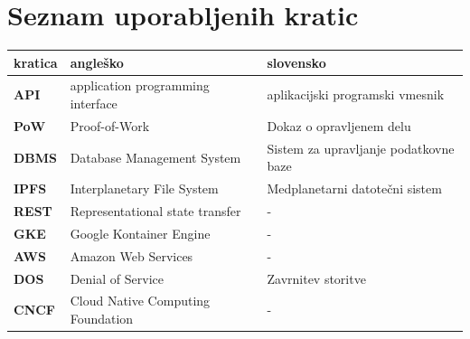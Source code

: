 \documentclass[a4paper, 12pt]{book}
\newcommand{\clearemptydoublepage}{\newpage{\pagestyle{empty}\cleardoublepage}}
\begin{document}
\clearemptydoublepage


\pagestyle{empty}
\def\thepage{}%
\tableofcontents{}


\clearemptydoublepage


\chapter*{Seznam uporabljenih kratic}  %

\noindent\begin{tabular}{p{}|p{}|p{}}    %
  {\bf kratica} & {\bf angleško}                             & {\bf slovensko} \\ \hline
  {\bf API}      & application programming interface & aplikacijski programski vmesnik \\
  {\bf PoW} & Proof-of-Work & Dokaz o opravljenem delu \\
  {\bf DBMS}   & Database Management System & Sistem za upravljanje podatkovne baze \\
  {\bf IPFS} & Interplanetary File System & Medplanetarni datotečni sistem \\
  {\bf REST} & Representational state transfer & - \\
  {\bf GKE} & Google Kontainer Engine & - \\
  {\bf AWS} & Amazon Web Services & - \\
  {\bf DOS} & Denial of Service & Zavrnitev storitve \\
  {\bf CNCF} & Cloud Native Computing Foundation & - \\
\end{tabular}
\end{document}
